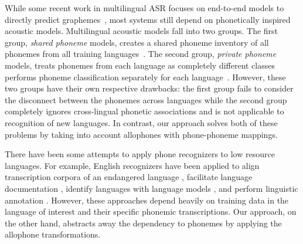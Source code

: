 \documentclass{article}
\begin{document}
While some recent work in multilingual ASR focuses on end-to-end models to directly predict graphemes~\cite{watanabe2017language, toshniwal2018multilingual}, most systems still depend on phonetically inspired acoustic models. Multilingual acoustic models fall into two groups.
The first group, \emph{shared phoneme} models, creates a shared phoneme inventory of all phonemes from all training languages~\cite{lin2009study,cohen1997towards,schultz2001language,schultz1997fast,li2020zero, thompson2019transferable}.
The second group, \emph{private phoneme} models, treats phonemes from each language as completely different classes performs phoneme classification separately for each language~\cite{huang2013cross,dalmia2018sequence,li2019multilingual}.
However, these two groups have their own respective drawbacks: the first group fails to consider the disconnect between the phonemes across languages while the second group completely ignores cross-lingual phonetic associations and is not applicable to recognition of new languages. In contrast, our approach solves both of these problems by taking into account allophones with phone-phoneme mappings.

There have been some attempts to apply phone recognizers to low resource languages. For example, English recognizers have been applied to align transcription corpora of an endangered language \cite{dicanio2013using}, facilitate language documentation \cite{michaud2018integrating}, identify languages with language models \cite{matejka2005phonotactic}, and perform linguistic annotation \cite{neubig2018towards}. However, these approaches depend heavily on training data in the language of interest and their specific phonemic transcriptions. Our approach, on the other hand, abstracts away the dependency to phonemes by applying the allophone transformations.




\end{document}
